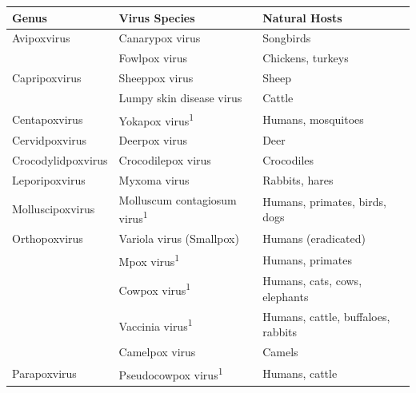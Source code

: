 \begin{table}[H]
	\centering
	\begin{tabular}{lll}
	\toprule
	\textbf{Genus}      & \textbf{Virus Species}                          & \textbf{Natural Hosts}                      \\ \midrule
	Avipoxvirus         & Canarypox virus                                 & Songbirds 									\\ 
						& Fowlpox virus                                   & Chickens, turkeys                           \\ \midrule
	Capripoxvirus       & Sheeppox virus                                  & Sheep                                       \\
	                    & Lumpy skin disease virus                        & Cattle                                      \\ \midrule
	Centapoxvirus       & Yokapox virus\textsuperscript{1}                & Humans, mosquitoes                          \\ \midrule
	Cervidpoxvirus      & Deerpox virus                                   & Deer                                        \\ \midrule
	Crocodylidpoxvirus  & Crocodilepox virus                              & Crocodiles                                  \\ \midrule
	Leporipoxvirus      & Myxoma virus                                    & Rabbits, hares                              \\ \midrule
	Molluscipoxvirus    & Molluscum contagiosum virus\textsuperscript{1}  & Humans, primates, birds, dogs               \\ \midrule
	Orthopoxvirus       & Variola virus (Smallpox)                        & Humans (eradicated)                         \\ 
						& Mpox virus\textsuperscript{1}                   & Humans, primates                            \\ 
						& Cowpox virus\textsuperscript{1}                 & Humans, cats, cows, elephants               \\ 
						& Vaccinia virus\textsuperscript{1}               & Humans, cattle, buffaloes, rabbits          \\ 
						& Camelpox virus                                  & Camels                                      \\ \midrule
	Parapoxvirus        & Pseudocowpox virus\textsuperscript{1}           & Humans, cattle                              \\ 

\end{tabular}
\end{table}
